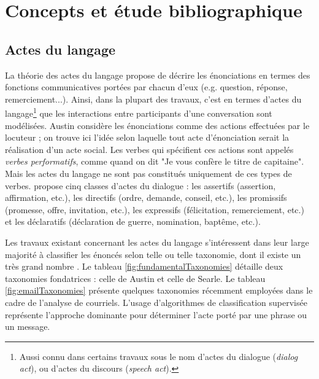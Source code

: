 
\chapter{Concepts et étude bibliographique}

\label{ch:background_and_related_work}

\section{Actes du langage}

La théorie des actes du langage \cite{austin1975things} propose de décrire les énonciations en termes des fonctions communicatives portées par chacun d'eux (e.g. question, réponse, remerciement...). Ainsi, dans la plupart des travaux, c'est en termes d'actes du langage\footnote{Aussi connu dans certains travaux sous le nom d'actes du dialogue (\textit{dialog act}), ou d'actes du discours (\textit{speech act}).} que les interactions entre participants d'une conversation sont modélisées. Austin considère les énonciations comme des actions effectuées par le locuteur ; on trouve ici l'idée selon laquelle tout acte d'énonciation serait la réalisation d'un acte social. Les verbes qui spécifient ces actions sont appelés \textit{verbes performatifs}, comme quand on dit "Je vous confère le titre de capitaine". Mais les actes du langage ne sont pas constitués uniquement de ces types de verbes. \cite{searle1976taxonomy} propose cinq classes d'actes du dialogue : les assertifs (assertion, affirmation, etc.), les directifs (ordre, demande, conseil, etc.), les promissifs (promesse, offre, invitation, etc.), les expressifs (félicitation, remerciement, etc.) et les déclaratifs (déclaration de guerre, nomination, baptême, etc.).

Les travaux existant concernant les actes du langage s'intéressent dans leur large majorité à classifier les énoncés selon telle ou telle taxonomie, dont il existe un très grand nombre \cite{traum200020}. Le tableau \ref{fig:fundamentalTaxonomies} détaille deux taxonomies fondatrices : celle de Austin et celle de Searle. Le tableau \ref{fig:emailTaxonomies} présente quelques taxonomies récemment employées dans le cadre de l'analyse de courriels. L'usage d'algorithmes de classification supervisée \cite{joty:2013:sigdial} représente l'approche dominante pour déterminer l'acte porté par une phrase ou un message.

